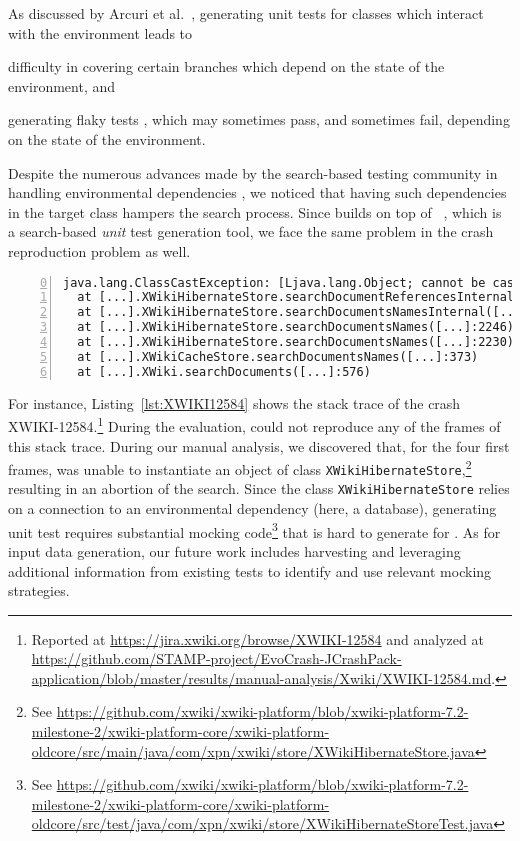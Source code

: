 As discussed by Arcuri et al.~\cite{Arcuri2014b}, generating unit tests for classes which interact with the environment leads to
\begin{inparaenum}[(i)]
\item difficulty in covering certain branches which depend on the state of the environment, and
\item generating flaky tests \cite{Luo2014}, which may sometimes pass, and sometimes fail, depending on the state of the environment. 
\end{inparaenum}
%
Despite the numerous advances made by the search-based testing community in handling environmental dependencies \cite{Arcuri2014b, Fraser2014b}, we noticed that having such dependencies in the target class hampers the search process.
%
Since \evocrash builds on top of \evosuite~\cite{fraser2012whole}, which is a search-based \textit{unit} test generation tool, we face the same problem in the crash reproduction problem as well.

\begin{lstlisting}[frame=tb,
float=t,
  caption=Stack trace for the crash XWIKI-12584,
  label=lst:XWIKI12584,
  captionpos=t,
  basicstyle={\scriptsize\ttfamily},
  numbers=left,
  firstnumber=0,
  breaklines=true,
  breakatwhitespace=true,
  tabsize=3,
  ]
java.lang.ClassCastException: [Ljava.lang.Object; cannot be cast to java.lang.String
  at [...].XWikiHibernateStore.searchDocumentReferencesInternal([...]:2457)
  at [...].XWikiHibernateStore.searchDocumentsNamesInternal([...]:2440)
  at [...].XWikiHibernateStore.searchDocumentsNames([...]:2246)
  at [...].XWikiHibernateStore.searchDocumentsNames([...]:2230)
  at [...].XWikiCacheStore.searchDocumentsNames([...]:373)
  at [...].XWiki.searchDocuments([...]:576)
\end{lstlisting}	

For instance, Listing~\ref{lst:XWIKI12584} shows the stack trace of the crash XWIKI-12584.\footnote{Reported at \url{https://jira.xwiki.org/browse/XWIKI-12584} and analyzed at \url{https://github.com/STAMP-project/EvoCrash-JCrashPack-application/blob/master/results/manual-analysis/Xwiki/XWIKI-12584.md}.} 
During the evaluation, \evocrash could not reproduce any of the frames of this stack trace. 
During our manual analysis, we discovered that, for the four first frames, \evocrash was unable to instantiate an object of class \texttt{XWikiHibernateStore},\footnote{See \url{https://github.com/xwiki/xwiki-platform/blob/xwiki-platform-7.2-milestone-2/xwiki-platform-core/xwiki-platform-oldcore/src/main/java/com/xpn/xwiki/store/XWikiHibernateStore.java}} resulting in an abortion of the search.
Since the class \texttt{XWikiHibernateStore} relies on a connection to an environmental dependency (here, a database), generating unit test requires substantial mocking code\footnote{See \url{https://github.com/xwiki/xwiki-platform/blob/xwiki-platform-7.2-milestone-2/xwiki-platform-core/xwiki-platform-oldcore/src/test/java/com/xpn/xwiki/store/XWikiHibernateStoreTest.java}} that is hard to generate for \evocrash. 
As for input data generation, our future work includes harvesting and leveraging additional information from existing tests to identify and use relevant mocking strategies. 

